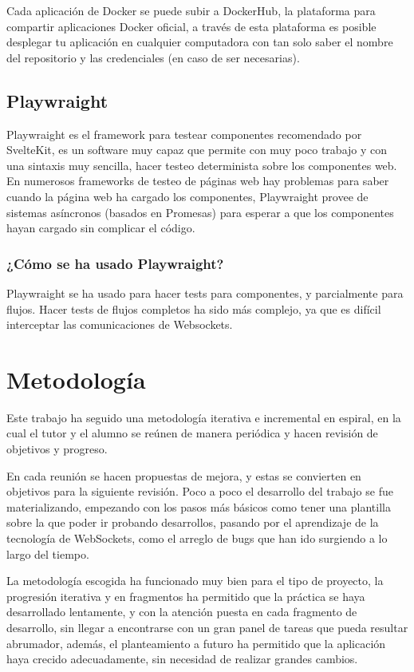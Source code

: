 Cada aplicación de Docker se puede subir a DockerHub, la plataforma para compartir aplicaciones Docker oficial, a través de esta plataforma es posible desplegar tu aplicación en cualquier computadora con tan solo saber el nombre del repositorio y las credenciales (en caso de ser necesarias).

\subsection{Playwraight}
Playwraight \cite{playwright_docs} es el framework para testear componentes recomendado por SvelteKit, es un software muy capaz que permite con muy poco trabajo y con una sintaxis muy sencilla, hacer testeo determinista sobre los componentes web. En numerosos frameworks de testeo de páginas web hay problemas para saber cuando la página web ha cargado los componentes, Playwraight provee de sistemas asíncronos (basados en Promesas) para esperar a que los componentes hayan cargado sin complicar el código.

\subsubsection{¿Cómo se ha usado Playwraight?}
Playwraight se ha usado para hacer tests para componentes, y parcialmente para flujos. Hacer tests de flujos completos ha sido más complejo, ya que es difícil interceptar las comunicaciones de Websockets.

\section{Metodología}
Este trabajo ha seguido una metodología iterativa e incremental en espiral, en la cual el tutor y el alumno se reúnen de manera periódica y hacen revisión de objetivos y progreso.

En cada reunión se hacen propuestas de mejora, y estas se convierten en objetivos para la siguiente revisión. Poco a poco el desarrollo del trabajo se fue materializando, empezando con los pasos más básicos como tener una plantilla sobre la que poder ir probando desarrollos, pasando por el aprendizaje de la tecnología de WebSockets, como el arreglo de bugs que han ido surgiendo a lo largo del tiempo.

La metodología escogida ha funcionado muy bien para el tipo de proyecto, la progresión iterativa y en fragmentos ha permitido que la práctica se haya desarrollado lentamente, y con la atención puesta en cada fragmento de desarrollo, sin llegar a encontrarse con un gran panel de tareas que pueda resultar abrumador, además, el planteamiento a futuro ha permitido que la aplicación haya crecido adecuadamente, sin necesidad de realizar grandes cambios.
